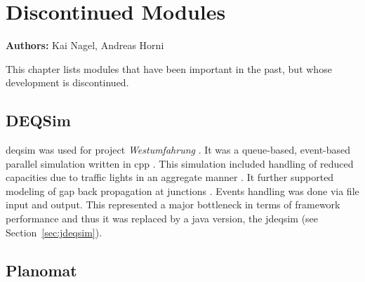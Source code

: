 \chapter{Discontinued Modules}
\label{ch:discontinued}

\hfill \textbf{Authors:} Kai Nagel, Andreas Horni

This chapter lists modules that have been important in the past, but whose development is discontinued.

\section{DEQSim}
\label{sec:deqsim}
\gls{deqsim} was used for project \emph{Westumfahrung} \citep[][]{BalmerEtAl_ResRep_bdktzrh_2009}. It was a queue-based, event-based parallel simulation written in \gls{cpp} \citep[][]{CharyparEtAl_TRR_2007, Charypar_PhDThesis_2008}. This simulation included handling of reduced capacities due to traffic lights in an aggregate manner \citep[][p.139 ff]{Charypar_PhDThesis_2008}. It further supported modeling of gap back propagation at junctions \citep[][p.98 ff]{Charypar_PhDThesis_2008}. Events handling was done via file input and output. This represented a major bottleneck in terms of framework performance and thus it was replaced by a \gls{java} version, the \gls{jdeqsim} (see Section~\ref{sec:jdeqsim}).

\section{Planomat}
\label{sec:planomat}

